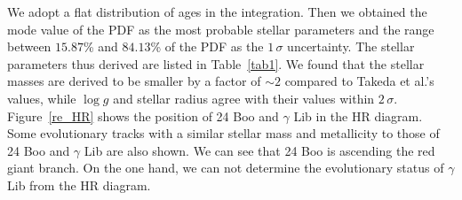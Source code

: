 \documentclass[]{pasj01}
\begin{document}
We adopt a flat distribution of ages in the integration.
Then we obtained the mode value of the PDF as the most probable stellar parameters and the range between $15.87$\% and $84.13$\% of the PDF as the $1\,\sigma$ uncertainty.
The stellar parameters thus derived are listed in Table~\ref{tab1}.
We found that the stellar masses are derived to be smaller by a factor of $\sim2$ compared to Takeda et al.'s values, while $\log g$ and stellar radius agree with their values within $2\,\sigma$.
Figure~\ref{re_HR} shows the position of 24 Boo and $\gamma$ Lib in the HR diagram.
Some evolutionary tracks \citep{Bressan2012} with a similar stellar mass and metallicity to those of 24 Boo and $\gamma$ Lib are also shown.
We can see that 24 Boo is ascending the red giant branch. 
On the one hand, we can not determine the evolutionary status of $\gamma$ Lib from the HR diagram.
\end{document}
